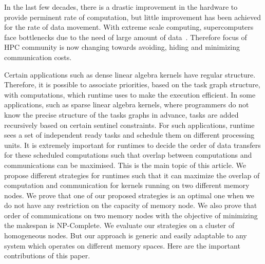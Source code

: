 \documentclass[sigconf]{acmart}
\begin{document}
	
	
	
	In the last few decades, there is a drastic improvement in the hardware to provide perminent rate of computation, but little improvement has been achieved for the rate of data movement. With extreme scale computing, supercomputers face bottlenecks due to the need of large amount of data~\cite{ascaccommitteereport2014,yelick2016}. Therefore focus of HPC community is now changing towards avoiding, hiding and minimizing communication costs.
	
	
	Certain applications such as dense linear algebra kernels have regular structure. Therefore, it is possible to associate priorities, based on the task graph structure, with computations, which runtime uses to make the execution efficient. In some applications, such as sparse linear algebra kernels, where programmers do not know the precise structure of the tasks graphs in advance,  tasks are added recursively based on certain sentinel constraints. For such applications, runtime sees a set of independent ready tasks and schedule them on different processing units. It is extremely important for runtimes to decide the order of data transfers for these scheduled computations such that overlap between computations and communications can be maximised. This is the main topic of this article. We propose different strategies for runtimes such that it can maximize the overlap of computation and communication for kernels running on two different memory nodes. We prove that one of our proposed strategies is an optimal one when we do not have any restriction on the capacity of memory node. We also prove that order of communications on two memory nodes  with the objective of minimizing the makespan is  NP-Complete. We evaluate our strategies on a cluster of homogeneous nodes. But our approach is generic and easily adaptable to any system which operates on different memory spaces. Here are the important contributions of this paper.
	
\end{document}
